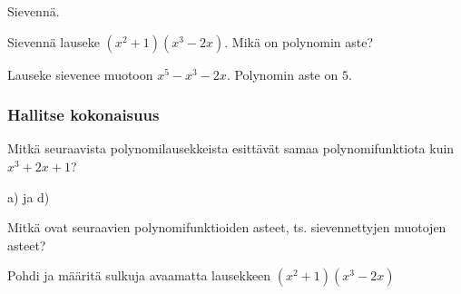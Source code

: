 \begin{tehtavasivu}
\begin{tehtava}
    Sievennä.
    \begin{vastaus}
    \end{vastaus}
\end{tehtava}

\begin{tehtava}
    Sievennä lauseke $(x^2+1)(x^3-2x)$. Mikä on polynomin aste?
    \begin{vastaus}
        Lauseke sievenee muotoon $x^5-x^3-2x$. Polynomin aste on $5$.
    \end{vastaus}
\end{tehtava}

\subsubsection*{Hallitse kokonaisuus}

\begin{tehtava}
	Mitkä seuraavista polynomilausekkeista esittävät samaa polynomifunktiota kuin
	$x^3+2x+1$?
	\begin{vastaus}
		a) ja d)
	\end{vastaus}
\end{tehtava}

\begin{tehtava}
	Mitkä ovat seuraavien polynomifunktioiden asteet, ts. sievennettyjen muotojen asteet?

	\begin{vastaus}
	\end{vastaus}
\end{tehtava}

\begin{tehtava}
    Pohdi ja määritä sulkuja avaamatta lausekkeen $(x^2+1)(x^3-2x)$
    \begin{vastaus}
    \end{vastaus}
\end{tehtava}


\end{tehtavasivu}
